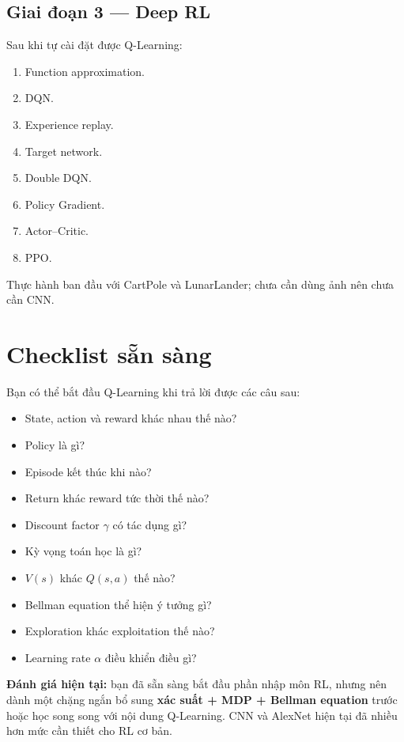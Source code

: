 \documentclass[12pt,a4paper]{article}
\begin{document}
\subsection{Giai đoạn 3 --- Deep RL}

Sau khi tự cài đặt được Q-Learning:

\begin{enumerate}[leftmargin=1.8em]
    \item Function approximation.
    \item DQN.
    \item Experience replay.
    \item Target network.
    \item Double DQN.
    \item Policy Gradient.
    \item Actor--Critic.
    \item PPO.
\end{enumerate}

Thực hành ban đầu với CartPole và LunarLander; chưa cần dùng ảnh nên chưa cần CNN.

\section{Checklist sẵn sàng}

Bạn có thể bắt đầu Q-Learning khi trả lời được các câu sau:

\begin{itemize}[leftmargin=1.5em]
    \item State, action và reward khác nhau thế nào?
    \item Policy là gì?
    \item Episode kết thúc khi nào?
    \item Return khác reward tức thời thế nào?
    \item Discount factor $\gamma$ có tác dụng gì?
    \item Kỳ vọng toán học là gì?
    \item $V(s)$ khác $Q(s,a)$ thế nào?
    \item Bellman equation thể hiện ý tưởng gì?
    \item Exploration khác exploitation thế nào?
    \item Learning rate $\alpha$ điều khiển điều gì?
\end{itemize}

\textbf{Đánh giá hiện tại:} bạn đã sẵn sàng bắt đầu phần nhập môn RL, nhưng nên dành một chặng ngắn bổ sung \textbf{xác suất + MDP + Bellman equation} trước hoặc học song song với nội dung Q-Learning. CNN và AlexNet hiện tại đã nhiều hơn mức cần thiết cho RL cơ bản.
\end{document}
